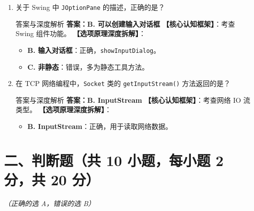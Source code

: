 ﻿\documentclass[12pt, a4paper]{ctexart}
\newcommand{\code}[1]{\texttt{#1}}
\begin{document}
\begin{enumerate}[label=\arabic*., itemsep=1.5em]
	\item 关于 Swing 中 \code{JOptionPane} 的描述，正确的是？
	      \begin{bluebox}{答案与深度解析}
		      \textbf{答案：B. 可以创建输入对话框}
		      \textbf{【核心认知框架】}：考查 Swing 组件功能。
		      \textbf{【选项原理深度拆解】}：
		      \begin{itemize}[leftmargin=*, nosep]
			      \item \textbf{B. 输入对话框}：正确，\code{showInputDialog}。
			      \item \textbf{C. 非静态}：错误，多为静态工具方法。
		      \end{itemize}
	      \end{bluebox}

	\item 在 TCP 网络编程中，\code{Socket} 类的 \code{getInputStream()} 方法返回的是？
	      \begin{bluebox}{答案与深度解析}
		      \textbf{答案：B. InputStream}
		      \textbf{【核心认知框架】}：考查网络 IO 流类型。
		      \textbf{【选项原理深度拆解】}：
		      \begin{itemize}[leftmargin=*, nosep]
			      \item \textbf{B. InputStream}：正确，用于读取网络数据。
		      \end{itemize}
	      \end{bluebox}
\end{enumerate}

\newpage
\section{二、判断题（共 10 小题，每小题 2 分，共 20 分）}
\textit{（正确的选 A，错误的选 B）}
\end{document}
